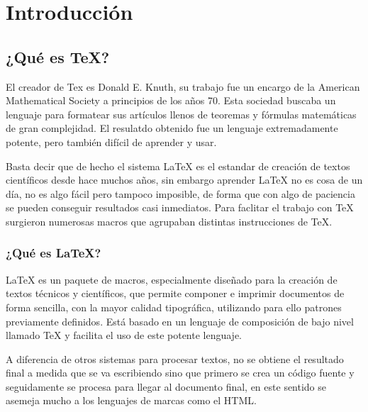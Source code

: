 \chapter{Introducci\'on}\label{intro}

\section{¿Qu\'e es \TeX{}?}

	El creador de Tex es Donald E. Knuth, su trabajo fue un encargo de la American Mathematical Society a principios de los a\~nos 70. Esta sociedad buscaba un lenguaje para formatear sus art\'iculos llenos de teoremas y f\'ormulas matem\'aticas de gran complejidad. El resulatdo obtenido fue un lenguaje extremadamente potente, pero tambi\'en dif\'icil de aprender y usar. 

	Basta decir que de hecho el sistema \LaTeX{} es el estandar de creaci\'on de textos cient\'ificos desde hace muchos a\~nos, sin embargo aprender \LaTeX{} no es cosa de un d\'ia, no es algo f\'acil pero tampoco imposible, de forma que con algo de paciencia se pueden conseguir resultados casi inmediatos. Para faclitar el trabajo con \TeX{} surgieron numerosas macros que agrupaban distintas instrucciones de \TeX{}.\\
				
	\subsection{¿Qu\'e es \LaTeX{}?}
		\LaTeX{} es un paquete de macros, especialmente dise\~nado para la creaci\'on de textos t\'ecnicos y cient\'ificos, que permite componer e imprimir documentos de forma sencilla, con la mayor calidad tipogr\'afica, utilizando para ello patrones previamente definidos. Est\'a basado en un lenguaje de composici\'on de bajo nivel llamado \TeX{} y facilita el uso de este potente lenguaje. 
		
			A diferencia de otros sistemas para procesar textos, no se obtiene el resultado final a medida que se va escribiendo sino que primero se crea un c\'odigo fuente y seguidamente se procesa para llegar al documento final, en este sentido se asemeja mucho a los lenguajes de marcas como el HTML.
		

